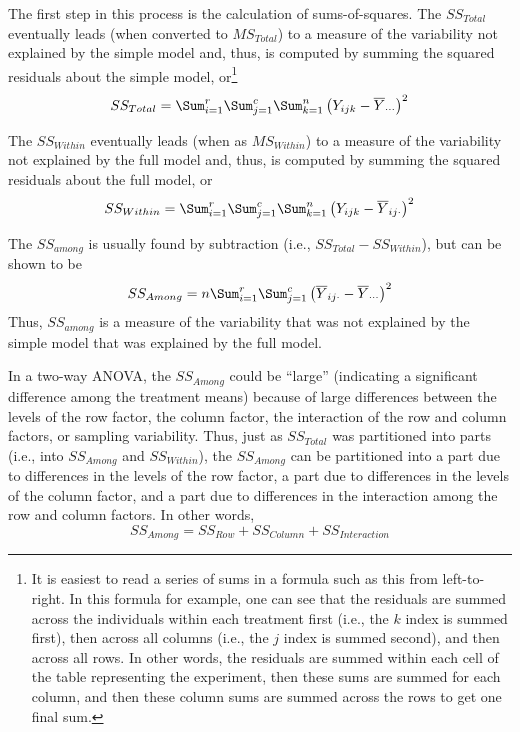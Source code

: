 \documentclass[10pt,openany]{book}\usepackage[]{graphicx}\usepackage[]{color}
\begin{document}
The first step in this process is the calculation of sums-of-squares.  The $SS_{Total}$ eventually leads (when converted to $MS_{Total}$) to a measure of the variability not explained by the simple model and, thus, is computed by summing the squared residuals about the simple model, or\footnote{It is easiest to read a series of sums in a formula such as this from left-to-right.  In this formula for example, one can see that the residuals are summed across the individuals within each treatment first (i.e., the $k$ index is summed first), then across all columns (i.e., the $j$ index is summed second), and then across all rows.  In other words, the residuals are summed within each cell of the table representing the experiment, then these sums are summed for each column, and then these column sums are summed across the rows to get one final sum.}
\[
  SS_{Total} = \Sum_{i=1}^{r}\Sum_{j=1}^{c}\Sum_{k=1}^{n}\left(Y_{ijk}-\overline{Y}_{\cdot\cdot\cdot}\right)^{2}
\]

The $SS_{Within}$ eventually leads (when as $MS_{Within}$) to a measure of the variability not explained by the full model and, thus, is computed by summing the squared residuals about the full model, or
\[
  SS_{Within} = \Sum_{i=1}^{r}\Sum_{j=1}^{c}\Sum_{k=1}^{n}\left(Y_{ijk}-\overline{Y}_{ij\cdot}\right)^{2}
\]

The $SS_{among}$ is usually found by subtraction (i.e., $SS_{Total}-SS_{Within}$), but can be shown to be
\[
  SS_{Among} = n\Sum_{i=1}^{r}\Sum_{j=1}^{c}\left(\overline{Y}_{ij\cdot}-\overline{Y}_{\cdot\cdot\cdot}\right)^{2}
\]
Thus, $SS_{among}$ is a measure of the variability that was not explained by the simple model that was explained by the full model.

In a two-way ANOVA, the $SS_{Among}$ could be ``large'' (indicating a significant difference among the treatment means) because of large differences between the levels of the row factor, the column factor, the interaction of the row and column factors, or sampling variability.  Thus, just as $SS_{Total}$ was partitioned into parts (i.e., into $SS_{Among}$ and $SS_{Within}$), the $SS_{Among}$ can be partitioned into a part due to differences in the levels of the row factor, a part due to differences in the levels of the column factor, and a part due to differences in the interaction among the row and column factors.  In other words,
\begin{equation} \label{eqn:SSAmongPartition1}
  SS_{Among} = SS_{Row} + SS_{Column} + SS_{Interaction}
\end{equation}
\end{document}
